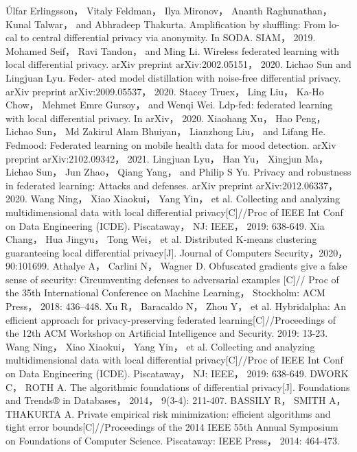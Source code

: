 \documentclass[12pt,openany,a4paper,fancyhdr,oneside]{ctexbook}
\begin{document}
\begin{thebibliography}{99}
Úlfar Erlingsson， Vitaly Feldman， Ilya Mironov， Ananth Raghunathan， Kunal Talwar， and Abhradeep Thakurta. Amplification by shuffling: From lo- cal to central differential privacy via anonymity. In SODA. SIAM， 2019.
Mohamed Seif， Ravi Tandon， and Ming Li. Wireless federated learning with local differential privacy. arXiv preprint arXiv:2002.05151， 2020.
Lichao Sun and Lingjuan Lyu. Feder- ated model distillation with noise-free differential privacy. arXiv preprint arXiv:2009.05537， 2020.
Stacey Truex， Ling Liu， Ka-Ho Chow， Mehmet Emre Gursoy， and Wenqi Wei. Ldp-fed: federated learning with local differential privacy. In arXiv， 2020.
Xiaohang Xu， Hao Peng， Lichao Sun， Md Zakirul Alam Bhuiyan， Lianzhong Liu， and Lifang He. Fedmood: Federated learning on mobile health data for mood detection. arXiv preprint arXiv:2102.09342， 2021.
Lingjuan Lyu， Han Yu， Xingjun Ma， Lichao Sun， Jun Zhao， Qiang Yang， and Philip S Yu. Privacy and robustness in federated learning: Attacks and defenses. arXiv preprint arXiv:2012.06337， 2020.
Wang  Ning，  Xiao  Xiaokui，  Yang  Yin，  et  al.  Collecting  and  analyzing 
multidimensional data with local differential privacy[C]//Proc of IEEE Int 
Conf on Data Engineering (ICDE). Piscataway， NJ: IEEE， 2019: 638-649.
Xia  Chang，  Hua  Jingyu，  Tong  Wei，  et  al.  Distributed  K-means  clustering 
guaranteeing local differential privacy[J]. Journal of Computers Security，2020，90:101699.
Athalye A， Carlini N， Wagner D. Obfuscated gradients give a false sense of security: Circumventing defenses to adversarial examples [C]// Proc of the 35th International Conference on Machine Learning， Stockholm: ACM Press， 2018: 436–448.
Xu R， Baracaldo N， Zhou Y， et al. Hybridalpha: An efficient approach for privacy-preserving federated learning[C]//Proceedings of the 12th ACM Workshop on Artificial Intelligence and Security. 2019: 13-23.
Wang  Ning，  Xiao  Xiaokui，  Yang  Yin，  et  al.  Collecting  and  analyzing 
multidimensional data with local differential privacy[C]//Proc of IEEE Int 
Conf on Data Engineering (ICDE). Piscataway， NJ: IEEE， 2019: 638-649.
DWORK C， ROTH A. The algorithmic foundations of differential privacy[J]. Foundations and Trends® in Databases， 2014， 9(3-4): 211-407.
BASSILY R， SMITH A， THAKURTA A. Private empirical risk minimization: efficient algorithms and tight error bounds[C]//Proceedings of the 2014 IEEE 55th Annual Symposium on Foundations of Computer Science. Piscataway: IEEE Press， 2014: 464-473.

\end{thebibliography}
\end{document}

